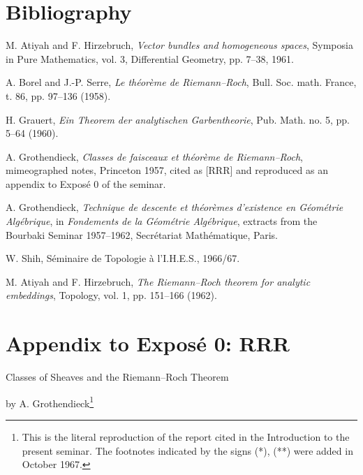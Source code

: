 \section*{Bibliography}
\begin{enumerate}[label={[\arabic*]},leftmargin=2.5em]
\item M. Atiyah and F. Hirzebruch, \emph{Vector bundles and homogeneous spaces}, Symposia in Pure Mathematics, vol. 3, Differential Geometry, pp. 7--38, 1961.
\item A. Borel and J.-P. Serre, \emph{Le th\'eor\`eme de Riemann--Roch}, Bull. Soc. math. France, t. 86, pp. 97--136 (1958).
\item H. Grauert, \emph{Ein Theorem der analytischen Garbentheorie}, Pub. Math. no. 5, pp. 5--64 (1960).
\item A. Grothendieck, \emph{Classes de faisceaux et th\'eor\`eme de Riemann--Roch}, mimeographed notes, Princeton 1957, cited as [RRR] and reproduced as an appendix to Expos\'e 0 of the seminar.
\item A. Grothendieck, \emph{Technique de descente et th\'eor\`emes d'existence en G\'eom\'etrie Alg\'ebrique}, in \emph{Fondements de la G\'eom\'etrie Alg\'ebrique}, extracts from the Bourbaki Seminar 1957--1962, Secr\'etariat Math\'ematique, Paris.
\item W. Shih, S\'eminaire de Topologie \`a l'I.H.E.S., 1966/67.
\item M. Atiyah and F. Hirzebruch, \emph{The Riemann--Roch theorem for analytic embeddings}, Topology, vol. 1, pp. 151--166 (1962).
\end{enumerate}



\clearpage



\section*{Appendix to Exposé 0: RRR}
\begin{center}
{\Large Classes of Sheaves and the Riemann--Roch Theorem}\par
\vspace{0.5em}
by A. Grothendieck\footnote{This is the literal reproduction of the report cited in the Introduction to the present seminar. The footnotes indicated by the signs (*), (**) were added in October 1967.}
\end{center}

